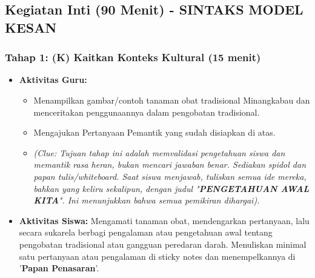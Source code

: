 \documentclass[a4paper,12pt]{article}
\begin{document}
\subsection{Kegiatan Inti (90 Menit) - SINTAKS MODEL KESAN}

\subsubsection{Tahap 1: (K) Kaitkan Konteks Kultural (15 menit)}
\begin{itemize}
\item \textbf{Aktivitas Guru:}
    \begin{itemize}
    \item Menampilkan gambar/contoh tanaman obat tradisional Minangkabau dan menceritakan penggunaannya dalam pengobatan tradisional.
    \item Mengajukan Pertanyaan Pemantik yang sudah disiapkan di atas.
    \item \textit{(Clue: Tujuan tahap ini adalah memvalidasi pengetahuan siswa dan memantik rasa heran, bukan mencari jawaban benar. Sediakan spidol dan papan tulis/whiteboard. Saat siswa menjawab, tuliskan semua ide mereka, bahkan yang keliru sekalipun, dengan judul "\textbf{PENGETAHUAN AWAL KITA}". Ini menunjukkan bahwa semua pemikiran dihargai).}
    \end{itemize}
\item \textbf{Aktivitas Siswa:} Mengamati tanaman obat, mendengarkan pertanyaan, lalu secara sukarela berbagi pengalaman atau pengetahuan awal tentang pengobatan tradisional atau gangguan peredaran darah. Menuliskan minimal satu pertanyaan atau pengalaman di sticky notes dan menempelkannya di '\textbf{Papan Penasaran}'.
\end{itemize}
\end{document}
